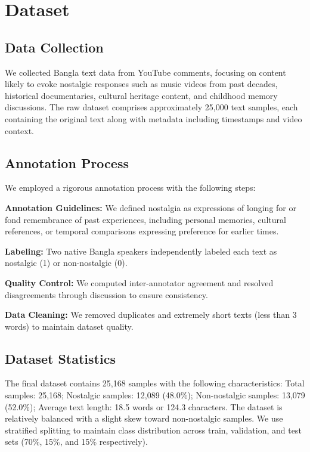 \documentclass[conference]{IEEEtran}
\begin{document}
\section{Dataset}
\label{sec:dataset}

\subsection{Data Collection}

We collected Bangla text data from YouTube comments, focusing on content likely to evoke nostalgic responses such as music videos from past decades, historical documentaries, cultural heritage content, and childhood memory discussions. The raw dataset comprises approximately 25,000 text samples, each containing the original text along with metadata including timestamps and video context.

\subsection{Annotation Process}

We employed a rigorous annotation process with the following steps:

\textbf{Annotation Guidelines:} We defined nostalgia as expressions of longing for or fond remembrance of past experiences, including personal memories, cultural references, or temporal comparisons expressing preference for earlier times.

\textbf{Labeling:} Two native Bangla speakers independently labeled each text as nostalgic (1) or non-nostalgic (0).

\textbf{Quality Control:} We computed inter-annotator agreement and resolved disagreements through discussion to ensure consistency.

\textbf{Data Cleaning:} We removed duplicates and extremely short texts (less than 3 words) to maintain dataset quality.

\subsection{Dataset Statistics}

The final dataset contains 25,168 samples with the following characteristics: Total samples: 25,168; Nostalgic samples: 12,089 (48.0\%); Non-nostalgic samples: 13,079 (52.0\%); Average text length: 18.5 words or 124.3 characters. The dataset is relatively balanced with a slight skew toward non-nostalgic samples. We use stratified splitting to maintain class distribution across train, validation, and test sets (70\%, 15\%, and 15\% respectively).
\end{document}
